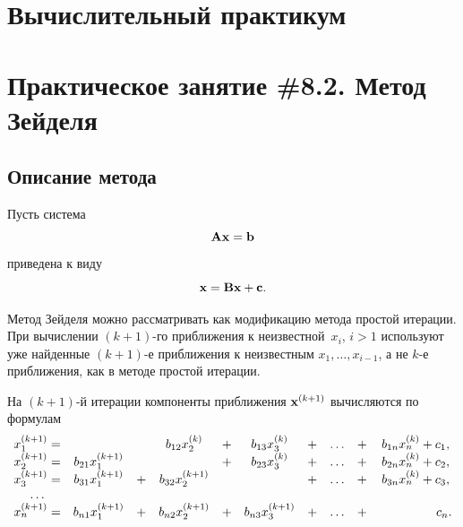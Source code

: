 \documentclass[12pt]{article}
\begin{document}
    \begin{flushright}
	\end{flushright}
	\begin{flushright}
	\end{flushright}
    \section*{Вычислительный практикум}
    \section*{Практическое занятие \#8.2. Метод Зейделя}

	\subsection*{Описание метода}
	
	Пусть система
	\begin{equation}
		\bold{A}\bold{x}=\bold{b}\label{f1}
	\end{equation}
	приведена к виду
	\begin{equation}
		\bold{x}=\bold{Bx}+\bold{c}.\label{f2}
	\end{equation}
	
	Метод Зейделя можно рассматривать как модификацию метода простой итерации. При вычислении $\left(k+1\right)$-го приближения к неизвестной~$x_i$, $i>1$ используют уже найденные $\left(k+1\right)$-е приближения к неизвестным $x_1,\ldots, x_{i-1}$, а не $k$-е приближения, как в методе простой итерации.
	
	На $\left(k+1\right)$-й итерации компоненты приближения $\bold{x}^{\left(k+1\right)}$ вычисляются по формулам
	\begin{equation}
		\begin{matrix}
			x_1^{\left(k+1\right)}  =&                            & &b_{12}x_2^{\left(k\right)}  &+&b_{13}x_3^{\left(k\right)}  &+\hspace{3mm}\ldots\hspace{3mm}+&b_{1n}x_n^{\left(k\right)} + c_1,\\
			x_2^{\left(k+1\right)}  =&b_{21}x_1^{\left(k+1\right)}& &                            &+&b_{23}x_3^{\left(k\right)}  &+\hspace{3mm}\ldots\hspace{3mm}+&b_{2n}x_n^{\left(k\right)} + c_2,\\
			x_3^{\left(k+1\right)}  =&b_{31}x_1^{\left(k+1\right)}&+&b_{32}x_2^{\left(k+1\right)}& &                            &+\hspace{3mm}\ldots\hspace{3mm}+&b_{3n}x_n^{\left(k\right)} + c_3,\\
			\ldots \\
			x_{n}^{\left(k+1\right)}=&b_{n1}x_1^{\left(k+1\right)}&+&b_{n2}x_2^{\left(k+1\right)}&+&b_{n3}x_3^{\left(k+1\right)}&+\hspace{3mm}\ldots\hspace{3mm}+&\hspace{16mm}c_n. \\
		\end{matrix}\label{fm3}
	\end{equation}
	
\end{document}
